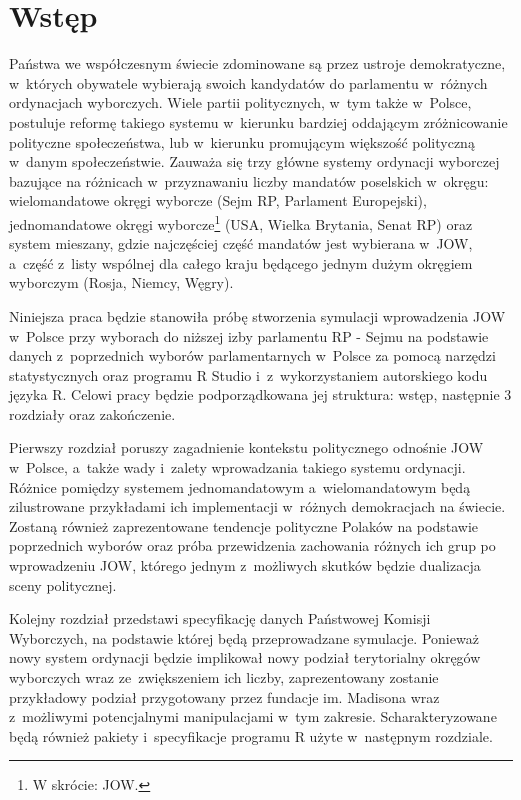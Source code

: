 
\def\filename{Introduction}
\chapter*{Wstęp}

Państwa we współczesnym świecie zdominowane są przez ustroje demokratyczne, w~których obywatele wybierają swoich kandydatów do parlamentu w~różnych ordynacjach wyborczych. Wiele partii politycznych, w~tym także w~Polsce, postuluje reformę takiego systemu w~kierunku bardziej oddającym zróżnicowanie polityczne społeczeństwa, lub w~kierunku promującym większość polityczną w~danym społeczeństwie. Zauważa się trzy główne systemy ordynacji wyborczej bazujące na różnicach w~przyznawaniu liczby mandatów poselskich w~okręgu: wielomandatowe okręgi wyborcze (Sejm RP, Parlament Europejski), jednomandatowe okręgi wyborcze\footnote{W skrócie: JOW.} (USA, Wielka Brytania, Senat RP) oraz system mieszany, gdzie najczęściej część mandatów jest wybierana w~JOW, a~część z~listy wspólnej dla całego kraju będącego jednym dużym okręgiem wyborczym (Rosja, Niemcy, Węgry).

Niniejsza praca będzie stanowiła próbę stworzenia symulacji wprowadzenia JOW w~Polsce przy wyborach do niższej izby parlamentu RP - Sejmu na podstawie danych z~poprzednich wyborów parlamentarnych w~Polsce za pomocą narzędzi statystycznych oraz programu R Studio i~z~wykorzystaniem autorskiego kodu języka R. Celowi pracy będzie podporządkowana jej struktura: wstęp, następnie 3 rozdziały oraz zakończenie.

Pierwszy rozdział poruszy zagadnienie kontekstu politycznego odnośnie JOW w~Polsce, a~także wady i~zalety wprowadzania takiego systemu ordynacji. Różnice pomiędzy systemem jednomandatowym a~wielomandatowym będą zilustrowane przykładami ich implementacji w~różnych demokracjach na świecie. Zostaną również zaprezentowane tendencje polityczne Polaków na podstawie poprzednich wyborów oraz próba przewidzenia zachowania różnych ich grup po wprowadzeniu JOW, którego jednym z~możliwych skutków będzie dualizacja sceny politycznej.

Kolejny rozdział przedstawi specyfikację danych Państwowej Komisji Wyborczych, na podstawie której będą przeprowadzane symulacje. Ponieważ nowy system ordynacji będzie implikował nowy podział terytorialny okręgów wyborczych wraz ze~zwiększeniem ich liczby, zaprezentowany zostanie przykładowy podział przygotowany przez fundacje im. Madisona wraz z~możliwymi potencjalnymi manipulacjami w~tym zakresie. Scharakteryzowane będą również pakiety i~specyfikacje programu R użyte w~następnym rozdziale.

